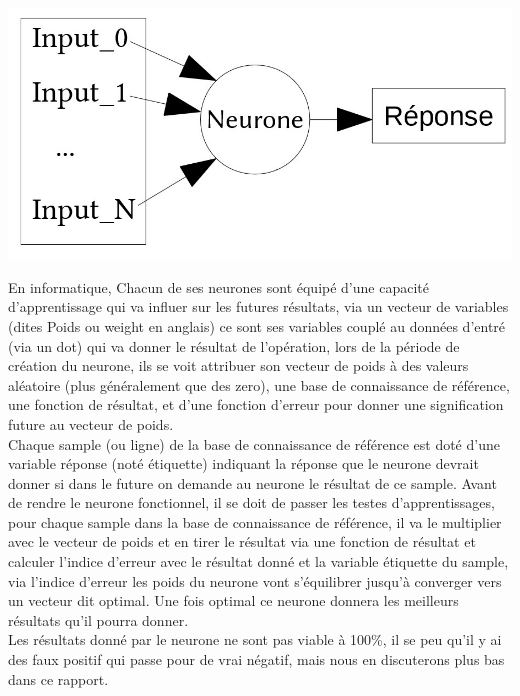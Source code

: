 \begin{center}
\includegraphics[scale=0.3]{img/neurone.jpg} 
\end{center}

En informatique, Chacun de ses neurones sont équipé d'une capacité d'apprentissage qui va influer sur les futures résultats, via un vecteur de variables (dites Poids ou weight en anglais) ce sont ses variables couplé au données d'entré (via un dot) qui va donner le résultat de l'opération, lors de la période de création du neurone, ils se voit attribuer son vecteur de poids à des valeurs aléatoire (plus généralement que des zero), une base de connaissance de référence,  une fonction de résultat, et d'une fonction d'erreur pour donner une signification future au vecteur de poids.\\
\linebreak
Chaque sample (ou ligne) de la base de connaissance de référence est doté d'une variable réponse (noté étiquette) indiquant la réponse que le neurone devrait donner si dans le future on demande au neurone le résultat de ce sample. Avant de rendre le neurone fonctionnel, il se doit de passer les testes d'apprentissages, pour chaque sample dans la base de connaissance de référence, il va le multiplier avec le vecteur de poids et en tirer le résultat via une fonction de résultat et calculer l'indice d'erreur avec le résultat donné et la variable étiquette du sample, via l'indice d'erreur les poids du neurone vont s'équilibrer jusqu'à converger vers un vecteur dit optimal. Une fois optimal ce neurone donnera les meilleurs résultats qu'il pourra donner.\\
\linebreak
Les résultats donné par le neurone ne sont pas viable à 100\%, il se peu qu'il y ai des faux positif qui passe pour de vrai négatif, mais nous en discuterons plus bas dans ce rapport.

\pagebreak
